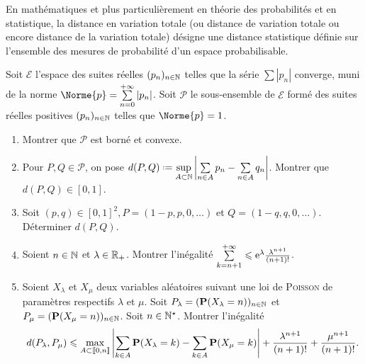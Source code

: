 En mathématiques et plus particulièrement en théorie des probabilités et en statistique, la distance en variation totale (ou distance de variation totale ou encore distance de la variation totale) désigne une distance statistique définie sur l'ensemble des mesures de probabilité d'un espace probabilisable. 

\begin{exercice}
Soit $\mathscr{E}$ l'espace des suites réelles $(p_n)_{n \in \N}$ telles que la série $\sum |p_n|$ converge, muni de la norme $\Norme{p} = \sum\limits_{n=0}^{+\infty} |p_n|$. Soit $\mathscr{P}$ le sous-ensemble de $\mathscr{E}$ formé des suites réelles positives $(p_n)_{n \in \N}$ telles que $\Norme{p}=1$.
\begin{enumerate}
    \item Montrer que $\mathscr{P}$ est borné et convexe. \\
    \item Pour $P, Q \in \mathscr{P}$, on pose $d(P, Q) \defeq \sup\limits_{A \subset \N} \left| \sum\limits_{n \in A} p_n - \sum\limits_{n \in A} q_n \right|$. Montrer que $d(P,Q) \in [0,1]$.
    \item Soit $(p,q) \in [0, 1]^2, P = (1-p, p, 0, \dots)$ et $Q = (1-q, q, 0, \dots)$. Déterminer $d(P, Q)$.
    \item Soient $n \in \N$ et $\lambda \in \Rp$. Montrer l'inégalité $\sum\limits_{k=n+1}^{+\infty} \leqslant \me^{\lambda} \frac{\lambda^{n+1}}{(n+1)!}$.
    \item Soient $X_\lambda$ et $X_\mu$ deux variables aléatoires suivant une loi de \textsc{Poisson} de paramètres respectifs $\lambda$ et $\mu$. Soit $P_\lambda = (\P(X_\lambda=n))_{n \in \N}$ et $P_\mu = (\P(X_\mu=n))_{n \in \N}$. Soit $n \in \Ne$. Montrer l'inégalité
    $$d(P_\lambda, P_\mu) \leqslant \max_{A \subset \llbracket 0, n \rrbracket} \left| \sum_{k \in A} \P(X_\lambda=k) - \sum_{k \in A} \P(X_\mu=k) \right| + \frac{\lambda^{n+1}}{(n+1)!} + \frac{\mu^{n+1}}{(n+1)!}.$$
\end{enumerate}
\end{exercice}


